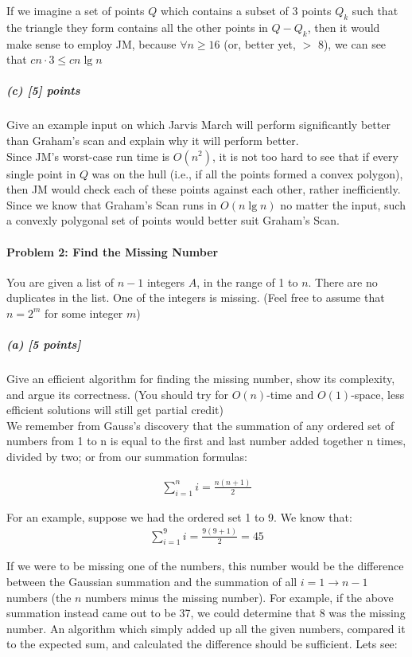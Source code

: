 \documentclass[11pt]{article}
\begin{document}
\noindent If we imagine a set of points {$Q$} which contains a subset of 3 points {$Q_k$} such that the triangle they form contains all the other points in {$Q - Q_k$}, then it would make sense to employ JM, because $\forall n \geq 16$ (or, better yet, $>$ 8), we can see that $cn \cdot 3 \leq cn \lg n$ 
\subparagraph{(c) [5] points} 
Give an example input on which Jarvis March will perform significantly better than Graham's scan and explain why it will perform better.\\

\noindent Since JM's worst-case run time is $O(n^2)$, it is not too hard to see that if every single point in $Q$ was on the hull (i.e., if all the points formed a convex polygon), then JM would check each of these points against each other, rather inefficiently. Since we know that Graham's Scan runs in $O(n \lg n)$ no matter the input, such a convexly polygonal set of points would better suit Graham's Scan. 

\paragraph{Problem 2: Find the Missing Number}
You are given a list of $n-1$ integers $A$, in the range of 1 to $n$. There are no duplicates in the list. One of the integers is missing.
(Feel free to assume that $n = 2^m$ for some integer $m$)
\subparagraph{(a) [5 points]}
Give an efficient algorithm for finding the missing number, show its complexity, and argue its correctness.
(You should try for $O(n)$-time and $O(1)$-space, less efficient solutions will still get partial credit)\\

We remember from Gauss's discovery that the summation of any ordered set of numbers from 1 to n is equal to the first and last number added together n times, divided by two; or from our summation formulas:

\begin{align*}
\sum_{\textstyle i=1}^{\textstyle n} i = \frac{n(n+1)}{2}
\end{align*}

For an example, suppose we had the ordered set 1 to 9. We know that:
\begin{align*}
\sum_{\textstyle i=1}^{\textstyle 9} i = \frac{9(9+1)}{2} = 45
\end{align*}

If we were to be missing one of the numbers, this number would be the difference between the Gaussian summation and the summation of all $i =1 \to n-1$ numbers (the $n$ numbers minus the missing number). For example, if the above summation instead came out to be 37, we could determine that 8 was the missing number. An algorithm which simply added up all the given numbers, compared it to the expected sum, and calculated the difference should be sufficient. Lets see: 
\end{document}
